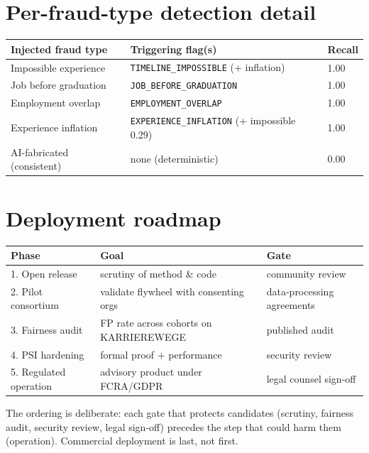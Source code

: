 \documentclass[11pt]{article}
\newcommand{\code}[1]{\texttt{\small #1}}
\begin{document}
\section{Per-fraud-type detection detail}\label{app:pertype}
\begin{table}[h]\centering\small
\begin{tabular}{lll}
\toprule
Injected fraud type & Triggering flag(s) & Recall\\
\midrule
Impossible experience & \code{TIMELINE\_IMPOSSIBLE} (+ inflation) & 1.00\\
Job before graduation & \code{JOB\_BEFORE\_GRADUATION} & 1.00\\
Employment overlap & \code{EMPLOYMENT\_OVERLAP} & 1.00\\
Experience inflation & \code{EXPERIENCE\_INFLATION} (+ impossible 0.29) & 1.00\\
AI-fabricated (consistent) & none (deterministic) & 0.00\\
\bottomrule
\end{tabular}
\end{table}

\section{Deployment roadmap}\label{app:roadmap}
\begin{table}[h]\centering\small
\begin{tabular}{lll}
\toprule
Phase & Goal & Gate\\
\midrule
1. Open release & scrutiny of method \& code & community review\\
2. Pilot consortium & validate flywheel with consenting orgs & data-processing agreements\\
3. Fairness audit & FP rate across cohorts on KARRIEREWEGE & published audit\\
4. PSI hardening & formal proof + performance & security review\\
5. Regulated operation & advisory product under FCRA/GDPR & legal counsel sign-off\\
\bottomrule
\end{tabular}
\end{table}
The ordering is deliberate: each gate that protects candidates (scrutiny, fairness
audit, security review, legal sign-off) precedes the step that could harm them
(operation). Commercial deployment is last, not first.
\end{document}
